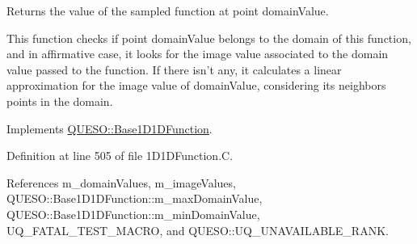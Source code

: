 Returns the value of the sampled function at point {\ttfamily domain\-Value}. 

This function checks if point {\ttfamily domain\-Value} belongs to the domain of {\ttfamily this} function, and in affirmative case, it looks for the image value associated to the domain value passed to the function. If there isn't any, it calculates a linear approximation for the image value of {\ttfamily domain\-Value}, considering its neighbors points in the domain. 

Implements \hyperlink{class_q_u_e_s_o_1_1_base1_d1_d_function_a1042dfd930c30a35d6dbf70f94e8dfe5}{Q\-U\-E\-S\-O\-::\-Base1\-D1\-D\-Function}.



Definition at line 505 of file 1\-D1\-D\-Function.\-C.



References m\-\_\-domain\-Values, m\-\_\-image\-Values, Q\-U\-E\-S\-O\-::\-Base1\-D1\-D\-Function\-::m\-\_\-max\-Domain\-Value, Q\-U\-E\-S\-O\-::\-Base1\-D1\-D\-Function\-::m\-\_\-min\-Domain\-Value, U\-Q\-\_\-\-F\-A\-T\-A\-L\-\_\-\-T\-E\-S\-T\-\_\-\-M\-A\-C\-R\-O, and Q\-U\-E\-S\-O\-::\-U\-Q\-\_\-\-U\-N\-A\-V\-A\-I\-L\-A\-B\-L\-E\-\_\-\-R\-A\-N\-K.


